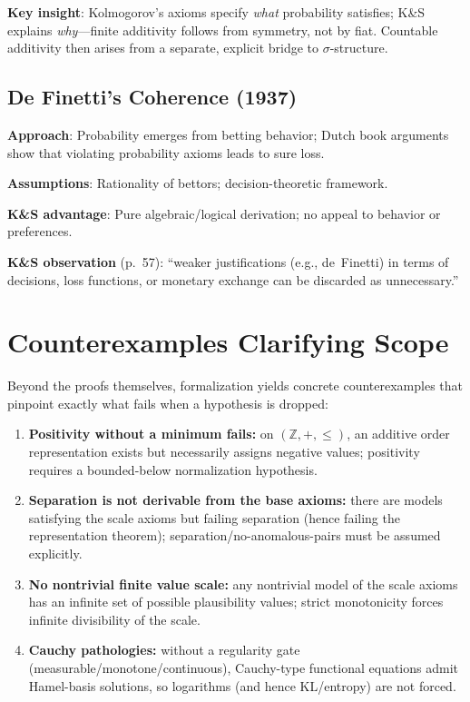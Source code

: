 \documentclass[11pt]{article}
\begin{document}
\textbf{Key insight}: Kolmogorov's axioms specify \emph{what} probability satisfies;
K\&S explains \emph{why}---finite additivity follows from symmetry, not by fiat.
Countable additivity then arises from a separate, explicit bridge to $\sigma$-structure.

\subsection{De Finetti's Coherence (1937)}

\textbf{Approach}: Probability emerges from betting behavior; Dutch book arguments
show that violating probability axioms leads to sure loss.

\textbf{Assumptions}: Rationality of bettors; decision-theoretic framework.

\textbf{K\&S advantage}: Pure algebraic/logical derivation; no appeal to behavior or preferences.

\textbf{K\&S observation} (p.~57): ``weaker justifications (e.g., de~Finetti) in terms
of decisions, loss functions, or monetary exchange can be discarded as unnecessary.''

\newpage
\section{Counterexamples Clarifying Scope}

Beyond the proofs themselves, formalization yields concrete counterexamples that pinpoint exactly what
fails when a hypothesis is dropped:
\begin{enumerate}
\item \textbf{Positivity without a minimum fails:} on $(\mathbb{Z},+, \le)$, an additive order representation exists
but necessarily assigns negative values; positivity requires a bounded-below normalization hypothesis.
\item \textbf{Separation is not derivable from the base axioms:} there are models satisfying the scale axioms
but failing separation (hence failing the representation theorem); separation/no-anomalous-pairs must be
assumed explicitly.
\item \textbf{No nontrivial finite value scale:} any nontrivial model of the scale axioms has an infinite set of
possible plausibility values; strict monotonicity forces infinite divisibility of the scale.
\item \textbf{Cauchy pathologies:} without a regularity gate (measurable/monotone/continuous), Cauchy-type
functional equations admit Hamel-basis solutions, so logarithms (and hence KL/entropy) are not forced.
\end{enumerate}
\end{document}
